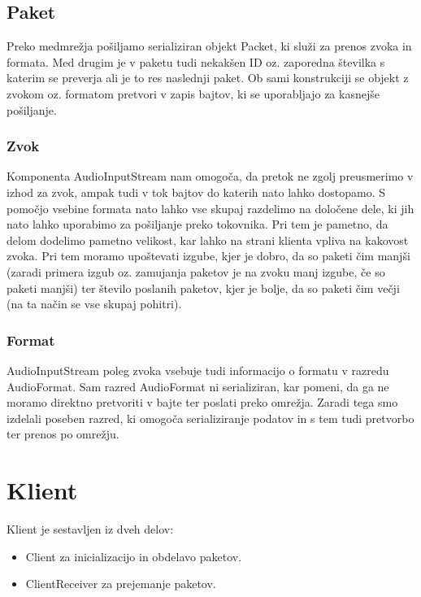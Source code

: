 \documentclass[journal]{IEEEtran}
\begin{document}
\subsection{Paket}
Preko medmrežja pošiljamo serializiran objekt Packet, ki služi za prenos zvoka in formata. Med drugim je v paketu tudi nekakšen ID oz. zaporedna številka s katerim se preverja ali je to res naslednji paket. Ob sami konstrukciji se objekt z zvokom oz. formatom pretvori v zapis bajtov, ki se uporabljajo za kasnejše pošiljanje.


\subsubsection{Zvok}
Komponenta AudioInputStream nam omogoča, da pretok ne zgolj preusmerimo v izhod za zvok, ampak tudi v tok bajtov do katerih nato lahko dostopamo. S pomočjo vsebine formata nato lahko vse skupaj razdelimo na določene dele, ki jih nato lahko uporabimo za pošiljanje preko tokovnika. Pri tem je pametno, da delom dodelimo pametno velikost, kar lahko na strani klienta vpliva na kakovost zvoka. Pri tem moramo upoštevati izgube, kjer je dobro, da so paketi čim manjši (zaradi primera izgub oz. zamujanja paketov je na zvoku manj izgube, če so paketi manjši) ter število poslanih paketov, kjer je bolje, da so paketi čim večji (na ta način se vse skupaj pohitri).

\subsubsection{Format}
AudioInputStream poleg zvoka vsebuje tudi informacijo o formatu v razredu AudioFormat. Sam razred AudioFormat ni serializiran, kar pomeni, da ga ne moramo direktno pretvoriti v bajte ter poslati preko omrežja. Zaradi tega smo izdelali poseben razred, ki omogoča serializiranje podatov in s tem tudi pretvorbo ter prenos po omrežju.


\section{Klient}

Klient je sestavljen iz dveh delov:
\begin{itemize}
	\item Client za inicializacijo in obdelavo paketov.
	\item  ClientReceiver za prejemanje paketov.
\end{itemize}
\end{document}
